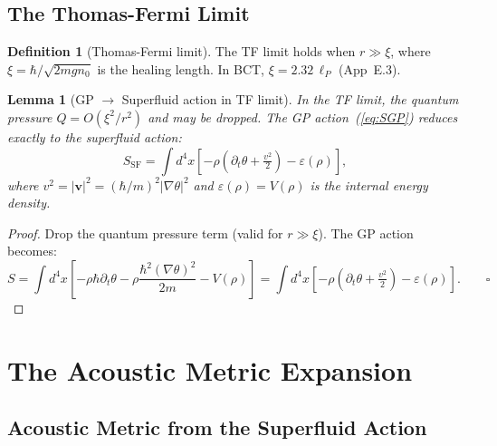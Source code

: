 \documentclass[11pt,a4paper]{article}
\theoremstyle{bctthm}
\newtheorem{lemma}[theorem]{Lemma}
\theoremstyle{definition}
\newtheorem{definition}{Definition}
\begin{document}
\subsection{The Thomas-Fermi Limit}

\begin{definition}[Thomas-Fermi limit]
The TF limit holds when $r \gg \xi$, where $\xi = \hbar/\sqrt{2mgn_0}$
is the healing length. In BCT, $\xi = 2.32\,\ell_P$ (App~E.3).
\end{definition}

\begin{lemma}[GP $\to$ Superfluid action in TF limit]\label{lem:TF}
In the TF limit, the quantum pressure $Q = O(\xi^2/r^2)$ and may be dropped.
The GP action~(\ref{eq:SGP}) reduces exactly to the superfluid action:
\begin{equation}
S_\mathrm{SF} = \int d^4x\left[-\rho(\partial_t\theta + \tfrac{v^2}{2})
- \varepsilon(\rho)\right],
\label{eq:SSF}
\end{equation}
where $v^2 = |\mathbf{v}|^2 = (\hbar/m)^2|\nabla\theta|^2$ and
$\varepsilon(\rho) = V(\rho)$ is the internal energy density.
\end{lemma}
\begin{proof}
Drop the quantum pressure term (valid for $r \gg \xi$). The GP action becomes:
\begin{equation*}
S = \int d^4x\left[-\rho\hbar\partial_t\theta
- \rho\frac{\hbar^2(\nabla\theta)^2}{2m} - V(\rho)\right]
= \int d^4x\left[-\rho(\partial_t\theta + \tfrac{v^2}{2}) - \varepsilon(\rho)\right].\qquad\square
\end{equation*}
\end{proof}

\section{The Acoustic Metric Expansion}

\subsection{Acoustic Metric from the Superfluid Action}
\end{document}
